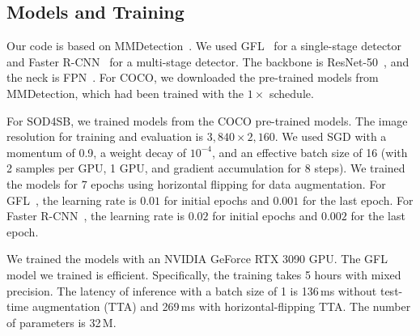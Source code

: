 \documentclass{mva_style}
\newcommand{\M}{\,M\xspace}
\newcommand{\MSEC}{\,ms\xspace}
\begin{document}
\subsection{Models and Training}

Our code is based on MMDetection~\cite{MMDetection}.
We used GFL~\cite{GFL_NeurIPS2020} for a single-stage detector
and Faster R-CNN~\cite{Faster_R-CNN_NIPS2015} for a multi-stage detector.
The backbone is ResNet-50~\cite{ResNet_CVPR2016}, and the neck is FPN~\cite{FPN_CVPR2017}.
For COCO, we downloaded the pre-trained models from MMDetection, which had been trained with the $1\times$ schedule.

For SOD4SB, we trained models from the COCO pre-trained models.
The image resolution for training and evaluation is $3,840{\times}2,160$.
We used SGD with a momentum of 0.9, a weight decay of $10^{-4}$, and an effective batch size of 16 (with 2 samples per GPU, 1 GPU, and gradient accumulation for 8 steps).
We trained the models for 7 epochs using horizontal flipping for data augmentation.
For GFL~\cite{GFL_NeurIPS2020}, the learning rate is $0.01$ for initial epochs and $0.001$ for the last epoch.
For Faster R-CNN~\cite{Faster_R-CNN_NIPS2015}, the learning rate is $0.02$ for initial epochs and $0.002$ for the last epoch.

We trained the models with an NVIDIA GeForce RTX 3090 GPU.
The GFL model we trained is efficient.
Specifically, the training takes 5 hours with mixed precision.
The latency of inference with a batch size of 1 is 136\MSEC without test-time augmentation (TTA) and 269\MSEC with horizontal-flipping TTA.
The number of parameters is 32\M.




\begin{table}[t]
	\setlength{\tabcolsep}{1.4mm}
	\caption{
		Standard metrics on SOD4SB.
	}
	\vspace{-2mm}
	\begin{center}
		\label{tab:sod4sb_results}
	\end{center}
\end{table}
\end{document}
